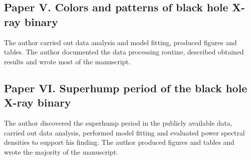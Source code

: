 \subsection*{Paper V. Colors and patterns of black hole X-ray binary \GX}
The author carried out data analysis and model fitting, produced figures and tables.
The author documented the data processing routine, described obtained results and wrote most of the manuscript.

\subsection*{Paper VI. Superhump period of the black hole X-ray binary \GX }
The author discovered the superhump period in the publicly available data, carried out data analysis, performed model fitting and evaluated power spectral densities to support his finding.
The author produced figures and tables and wrote the majority of the manuscript.



\renewcommand{\thesection}{\oldsection} 
